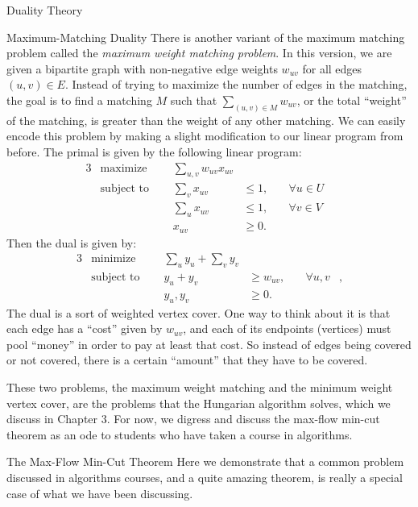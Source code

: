 \begin{section}{Duality Theory}
\begin{subsection}{Maximum-Matching Duality}
	There is another variant of the maximum matching problem called the 
	\emph{maximum weight matching problem}. In this 
	version, we are given a bipartite graph with non-negative edge weights $w_{uv}$ for all 
	edges $(u,v)\in E$. Instead of trying to maximize the number of edges in the matching, the goal 
	is to find a matching $M$ such that $\sum_{(u,v) \in M} w_{uv}$, or the total ``weight'' of the 
	matching, is greater than the weight of any other matching. 
	We can easily encode this problem by making 
	a slight modification to our linear program from before. The primal is given by the following 
	linear program:
	\begin{alignat}{3}
		& \text{maximize } & \sum_{u,v} w_{uv}x_{uv}& \\
		& \text{subject to } \quad & \sum_{v} x_{uv} & \leq 1, & \quad \forall u\in U& \\
				     &\quad & \sum_{u} x_{uv} & \leq 1, & \quad \forall v\in V & \\
				&& x_{uv} & \geq 0.
	\end{alignat}
	Then the dual is given by:
	\begin{alignat}{3}
		& \text{minimize } & \sum_{u} y_u + \sum_v y_v& \\
		& \text{subject to } \quad & y_u + y_v & \geq w_{uv}, & \quad \forall u,v &, \\
				    && y_u,y_v & \geq 0.
	\end{alignat}
	The dual is a sort of weighted vertex cover. One way to think about it is that each edge 
	has a ``cost'' given by $w_{uv}$, and each of its endpoints (vertices) must pool ``money'' 
	in order 
	to pay at least that cost. So instead of edges being covered or not covered, there is a certain 
	``amount'' that they have to be covered.

	These two problems, the maximum weight matching and the minimum weight vertex cover, are the 
	problems that the Hungarian algorithm solves, which we discuss in Chapter 3. For now, we digress 
	and discuss the max-flow min-cut theorem as an ode to students who have taken a course in 
	algorithms.
\end{subsection}

\begin{subsection}{The Max-Flow Min-Cut Theorem}
	Here we demonstrate that a common problem discussed in algorithms courses, and a quite 
	amazing theorem, is really a special case of what we have been discussing. 
	

\end{subsection}
\end{section}
